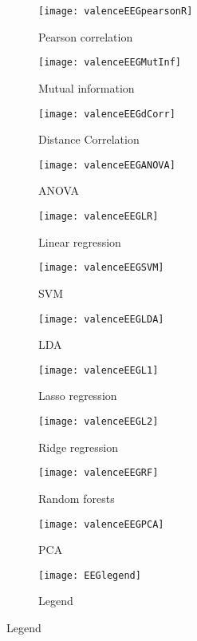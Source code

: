 \clearpage

\begin{figure}[!tbp]
  \centering
  \caption{Selection features for valence classification, using only EEG features.\label{valenceEEGpies}}
  \begin{subfigure}[b]{0.3\textwidth}
    \texttt{[image: valenceEEGpearsonR]}
    \caption{Pearson correlation}
  \end{subfigure}
  \hfill
  \begin{subfigure}[b]{0.3\textwidth}
    \texttt{[image: valenceEEGMutInf]}
    \caption{Mutual information}
  \end{subfigure}
  \hfill
  \begin{subfigure}[b]{0.3\textwidth}
    \texttt{[image: valenceEEGdCorr]}
    \caption{Distance Correlation}
  \end{subfigure}
  
  \begin{subfigure}[b]{0.3\textwidth}
    \texttt{[image: valenceEEGANOVA]}
    \caption{ANOVA}
  \end{subfigure}
  \hfill
  \begin{subfigure}[b]{0.3\textwidth}
    \texttt{[image: valenceEEGLR]}
    \caption{Linear regression}
  \end{subfigure}
  \hfill
  \begin{subfigure}[b]{0.3\textwidth}
    \texttt{[image: valenceEEGSVM]}
    \caption{SVM}
  \end{subfigure}
  
  \begin{subfigure}[b]{0.3\textwidth}
    \texttt{[image: valenceEEGLDA]}
    \caption{LDA}
  \end{subfigure}
  \hfill
  \begin{subfigure}[b]{0.3\textwidth}
    \texttt{[image: valenceEEGL1]}
    \caption{Lasso regression}
  \end{subfigure}
  \hfill
  \begin{subfigure}[b]{0.3\textwidth}
    \texttt{[image: valenceEEGL2]}
    \caption{Ridge regression}
  \end{subfigure}
  
  \begin{subfigure}[b]{0.3\textwidth}
    \texttt{[image: valenceEEGRF]}
    \caption{Random forests}
  \end{subfigure}
  \hfill
  \begin{subfigure}[b]{0.3\textwidth}
    \texttt{[image: valenceEEGPCA]}
    \caption{PCA}
  \end{subfigure}
  \hfill
  \begin{subfigure}[b]{0.3\textwidth}
    \texttt{[image: EEGlegend]}
    \caption{Legend\label{valencepiesEEGlegend}}
  \end{subfigure}
\end{figure}
\clearpage

